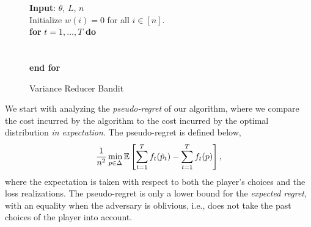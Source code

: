 \begin{figure}[t]
\begin{framed}
 \flushleft
 \textbf{Input}: $\theta$, $L$, $n$ \\
 Initialize $w(i)=0$ for all $i \in [n].$\\
   \textbf{for} $t=1,\ldots, T$ \textbf{do} \\
   \\
    \\
      \textbf{end for} \\
\end{framed}
\caption{Variance Reducer Bandit}
\label{alg:bandit}
\end{figure}
     
     
We start with analyzing the \emph{pseudo-regret} of our algorithm, where we compare the cost incurred by the algorithm to the cost incurred by the optimal distribution \emph{in expectation}. The pseudo-regret is defined below,
\begin{equation} \label{eq:bandit-regret}
\frac{1}{n^2}\min_{p \in \Delta }  \mathbb{E}\left[    \sum_{t=1}^T f_t(\tilde{p}_t)  -  \sum_{t=1}^T f_t(p) \right],
\end{equation}
where the expectation is taken with respect to both the player's choices and the loss realizations. The pseudo-regret is only a lower bound for the \emph{expected regret}, with  an equality when the adversary is oblivious, i.e., does not take the past choices of the player into account.


